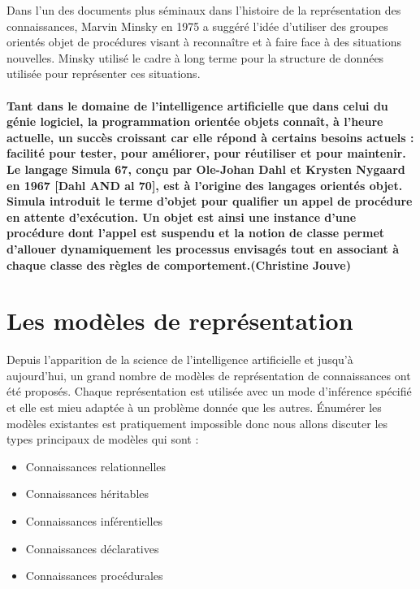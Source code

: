 \documentclass[12pt,a4paper]{report}
\begin{document}
{Dans l'un des documents plus séminaux dans l'histoire de la représentation des connaissances, Marvin Minsky en 1975 a suggéré l'idée d'utiliser des groupes orientés objet de procédures visant à reconnaître et à faire face à des situations nouvelles. Minsky utilisé le cadre à long terme pour la structure de données utilisée pour représenter ces situations.}\paragraph{\normalfont
Tant dans le domaine de l'intelligence artificielle que dans celui du génie logiciel, la programmation orientée objets connaît, à l'heure actuelle, un succès croissant car elle répond à certains besoins actuels : facilité pour tester, pour améliorer, pour réutiliser et pour maintenir. Le langage Simula 67, conçu par Ole-Johan Dahl et Krysten Nygaard en 1967 [Dahl AND al 70], est à l'origine des langages orientés objet. Simula introduit le terme d'objet pour qualifier un appel de procédure en attente d'exécution. Un objet est ainsi une instance d'une procédure dont l'appel est suspendu et la notion de classe permet d'allouer dynamiquement les processus envisagés tout en associant à chaque classe des règles de comportement.(Christine Jouve)}\paragraph{\normalfont
}
\cite{NRB}

\section{Les modèles de représentation}
Depuis l'apparition de la science de l'intelligence artificielle et jusqu'à aujourd'hui, un grand nombre de modèles
de représentation de connaissances ont été proposés. Chaque représentation est utilisée avec un mode d'inférence spécifié
et elle est mieu adaptée à un problème donnée que les autres. \'Enumérer les modèles existantes est pratiquement impossible
donc nous allons discuter les types principaux de modèles qui sont :
\begin{itemize}
\item Connaissances relationnelles
\item Connaissances héritables
\item Connaissances inférentielles
\item Connaissances déclaratives
\item Connaissances procédurales\cite{KRC}
\end{itemize}
\end{document}
